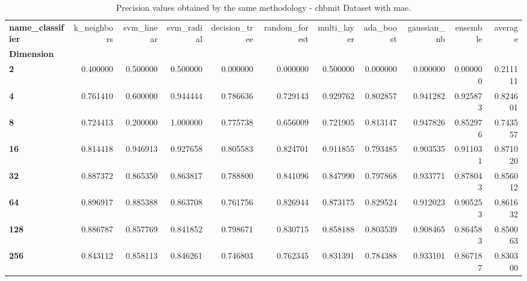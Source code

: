 \begin{table}
\centering
\caption{Precision values obtained by the same methodology - chbmit Dataset with mae.}
\label{precision_chbmit_mae-reproduction}
\begin{tabular}{lrrrrrrrrrr}
\toprule
\textbf{name\_classifier} &  k\_neighbors &  svm\_linear &  svm\_radial &  decision\_tree &  random\_forest &  multi\_layer &  ada\_boost &  gaussian\_nb &  ensemble &   average \\
\textbf{Dimension} &              &             &             &                &                &              &            &              &           &           \\
\midrule
\textbf{2        } &     0.400000 &    0.500000 &    0.500000 &       0.000000 &       0.000000 &     0.500000 &   0.000000 &     0.000000 &  0.000000 &  0.211111 \\
\textbf{4        } &     0.761410 &    0.600000 &    0.944444 &       0.786636 &       0.729143 &     0.929762 &   0.802857 &     0.941282 &  0.925873 &  0.824601 \\
\textbf{8        } &     0.724413 &    0.200000 &    1.000000 &       0.775738 &       0.656009 &     0.721905 &   0.813147 &     0.947826 &  0.852976 &  0.743557 \\
\textbf{16       } &     0.814418 &    0.946913 &    0.927658 &       0.805583 &       0.824701 &     0.911855 &   0.793485 &     0.903535 &  0.911031 &  0.871020 \\
\textbf{32       } &     0.887372 &    0.865350 &    0.863817 &       0.788800 &       0.841096 &     0.847990 &   0.797868 &     0.933771 &  0.878043 &  0.856012 \\
\textbf{64       } &     0.896917 &    0.885388 &    0.863708 &       0.761756 &       0.826944 &     0.873175 &   0.829524 &     0.912023 &  0.905253 &  0.861632 \\
\textbf{128      } &     0.886787 &    0.857769 &    0.841852 &       0.798671 &       0.830715 &     0.858188 &   0.803539 &     0.908465 &  0.864583 &  0.850063 \\
\textbf{256      } &     0.843112 &    0.858113 &    0.846261 &       0.746803 &       0.762345 &     0.831391 &   0.784388 &     0.933101 &  0.867187 &  0.830300 \\
\bottomrule
\end{tabular}
\end{table}
